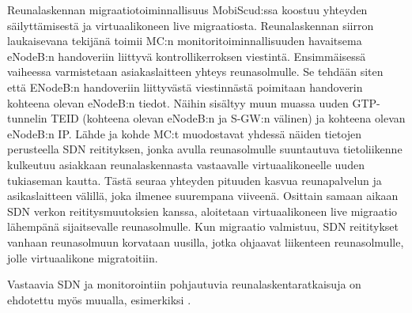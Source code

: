Reunalaskennan migraatiotoiminnallisuus MobiScud:ssa koostuu yhteyden säilyttämisestä ja virtuaalikoneen live migraatiosta.
Reunalaskennan siirron laukaisevana tekijänä toimii MC:n monitoritoiminnallisuuden havaitsema eNodeB:n handoveriin liittyvä kontrollikerroksen viestintä.
Ensimmäisessä vaiheessa varmistetaan asiakaslaitteen yhteys reunasolmulle. 
Se tehdään siten että ENodeB:n handoveriin liittyvästä viestinnästä poimitaan handoverin kohteena olevan eNodeB:n tiedot.
Näihin sisältyy muun muassa uuden GTP-tunnelin TEID (kohteena olevan eNodeB:n ja S-GW:n välinen) ja kohteena olevan eNodeB:n IP.
Lähde ja kohde MC:t muodostavat yhdessä näiden tietojen perusteella SDN reitityksen, jonka avulla reunasolmulle suuntautuva tietoliikenne kulkeutuu asiakkaan reunalaskennasta vastaavalle virtuaalikoneelle uuden tukiaseman kautta.
Tästä seuraa yhteyden pituuden kasvua reunapalvelun ja asikaslaitteen välillä, joka ilmenee suurempana viiveenä. 
Osittain samaan aikaan SDN verkon reititysmuutoksien kanssa, aloitetaan virtuaalikoneen live migraatio lähempänä sijaitsevalle reunasolmulle.
Kun migraatio valmistuu, SDN reititykset vanhaan reunasolmuun korvataan uusilla, jotka ohjaavat liikenteen reunasolmulle, jolle virtuaalikone migratoitiin.

Vastaavia SDN ja monitorointiin pohjautuvia reunalaskentaratkaisuja on ehdotettu myös muualla, esimerkiksi \cite{schiller2018cds}.

